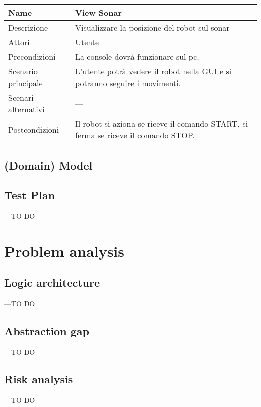 \documentclass[a4paper]{article}
\begin{document}
\begin{tabular}{ | m{5cm} | m{5cm}| }
	\hline
	Name&View Sonar\\ 
	\hline	
	Descrizione&Visualizzare la posizione del robot sul sonar\\
	\hline	
	Attori&Utente\\
	\hline	
	Precondizioni&La console dovrà funzionare sul pc.\\
	\hline	
	Scenario principale&L’utente potrà vedere il robot nella GUI e si potranno seguire i movimenti.\\
	\hline	
	Scenari alternativi&---\\
	\hline	
	Postcondizioni&Il robot si aziona se riceve il comando START, si ferma se riceve il comando STOP.\\
	\hline
\end{tabular}
\subsection {(Domain) Model }

\subsection {Test Plan}
---TO DO
\section{Problem analysis }

\subsection{Logic architecture}
---TO DO

\subsection{Abstraction gap}
---TO DO

\subsection{Risk analysis}
---TO DO
\end{document}
